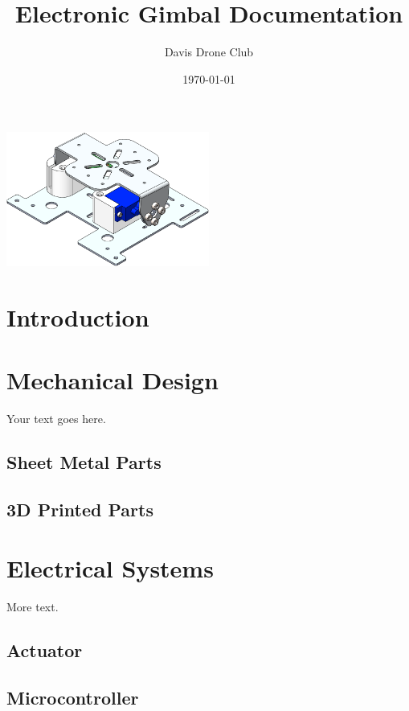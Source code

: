 \documentclass[11pt]{article} %
\title{Electronic Gimbal Documentation}
\author{Davis Drone Club}
\date{\today} %
\begin{document}
\maketitle
\begin{center}
\includegraphics[width = 0.5\textwidth]{Pictures/cover.png}
\end{center}

\newpage
\tableofcontents
{}
\newpage
\listoffigures
\listoftables

\newpage
{}
\section{Introduction}

\newpage
\section{Mechanical Design}

Your text goes here.

\subsection{Sheet Metal Parts}

\subsection{3D Printed Parts}

\newpage
\section{Electrical Systems}

More text.

\subsection{Actuator}

\subsection{Microcontroller}
\end{document}
